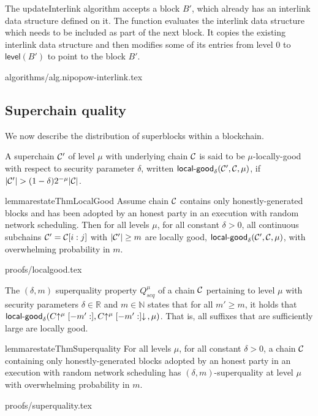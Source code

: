 The updateInterlink algorithm accepts a block $B'$, which already has an
interlink data structure defined on it. The function evaluates the
interlink data structure which needs to be included as part of the next block.
It copies the existing interlink data structure and
then modifies some of its entries from level $0$ to $\textsf{level}(B')$ to
point to the block $B'$.

{algorithms/alg.nipopow-interlink.tex}

\subsection{Superchain quality}

We now describe the distribution of superblocks within a blockchain.

\begin{definition}
A superchain $\mathcal{C}'$ of level
$\mu$ with underlying chain $\mathcal{C}$ is said to be $\mu$-\textnormal{locally-good}
with respect to security parameter $\delta$, written
$\textsf{local-good}_{\delta}(\mathcal{C}', \mathcal{C}, \mu)$, if $|\mathcal{C}'| > (1 -
\delta)2^{-\mu}|\mathcal{C}|$.
\end{definition}

\begin{restatable}{lemma}{restateThmLocalGood}
\label{lem.localgood}
Assume chain $\mathcal{C}$ contains only honestly-generated blocks and has been
adopted by an honest party in an execution with random network scheduling. Then
for all levels $\mu$, for all constant $\delta > 0$, all continuous subchains
$\mathcal{C}' = \mathcal{C}[i:j]$ with $|\mathcal{C}'| \geq m$ are locally good,
$\textsf{local-good}_{\delta}(\mathcal{C}', \mathcal{C}, \mu)$, with overwhelming
probability in $m$.
\end{restatable}
\ifonecolumn
{proofs/localgood.tex}
\fi

\begin{definition}
The $(\delta, m)$ superquality property
$Q^\mu_{scq}$ of a chain $\mathcal{C}$ pertaining to level $\mu$ with security
parameters $\delta \in \mathbb{R}$ and $m \in \mathbb{N}$ states that for all
$m' \geq m$, it holds that $\textsf{local-good}_{\delta}(C\negthickspace\uparrow^\mu[-m':],
C\negthickspace\uparrow^\mu[-m':]\negthickspace\downarrow\,, \mu)$. That is, all suffixes that are
sufficiently large are locally good.
\end{definition}

\begin{restatable}[Superquality]{lemma}{restateThmSuperquality}
\label{lem.superquality}
For all levels $\mu$, for all constant $\delta > 0$, a chain
$\mathcal{C}$ containing only honestly-generated blocks adopted by an honest party in
an execution with random network scheduling has $(\delta, m)$-superquality at level
$\mu$ with overwhelming probability in $m$.
\end{restatable}
\ifonecolumn
{proofs/superquality.tex}
\fi

